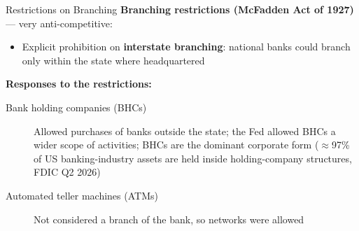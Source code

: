 \documentclass[aspectratio=169]{beamer}
\begin{document}
\begin{frame}{Restrictions on Branching}
\textbf{Branching restrictions (McFadden Act of 1927)} --- very anti-competitive:
\begin{itemize}
  \item Explicit prohibition on \textbf{interstate branching}: national banks could branch only within the state where headquartered
\end{itemize}
\vspace{0.2em}
\textbf{Responses to the restrictions:}
\begin{description}
  \item[Bank holding companies (BHCs)] Allowed purchases of banks outside the state; the Fed allowed BHCs a wider scope of activities; BHCs are the dominant corporate form ($\approx$97\% of US banking-industry assets are held inside holding-company structures, FDIC Q2 2026)
  \item[Automated teller machines (ATMs)] Not considered a branch of the bank, so networks were allowed
\end{description}
\end{frame}
\end{document}
